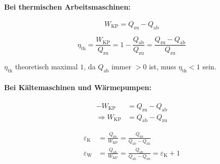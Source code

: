 			\paragraph{Bei thermischen Arbeitsmaschinen:} %
				\[
					W_{\text{KP}} = Q_{\text{zu}} - Q_{\text{ab}}
				\]
				
				\[
					\eta_{\text{th}} = \frac{W_{\text{KP}}}{Q_{\text{zu}}} = 1 - \frac{Q_{\text{ab}}}{Q_{\text{zu}}}
					= \frac{Q_{\text{zu}} - Q_{\text{ab}}}{Q_{\text{zu}}}
				\]
				
				$\eta_{\text{th}}$ theoretisch maximal $1$, da $Q_{\text{ab}}$ immer $> 0$ ist, muss $\eta_{\text{th}} < 1$ sein.
			
			\paragraph{Bei Kältemaschinen und Wärmepumpen:} %
				\begin{align*}
					-W_{\text{KP}} &= Q_{\text{zu}} - Q_{\text{ab}} \\
					\Rightarrow W_{\text{KP}} &= Q_{\text{ab}} - Q_{\text{zu}}
				\end{align*}
				
				\begin{align*}
					\varepsilon_{\text{K}} &= \frac{Q_{\text{zu}}}{W_{\text{KP}}} = \frac{Q_{\text{zu}}}{Q_{\text{ab}} - Q_{\text{zu}}} \\
					\varepsilon_{\text{W}} &= \frac{Q_{\text{ab}}}{W_{\text{KP}}} = \frac{Q_{\text{ab}}}{Q_{\text{ab}} - Q_{\text{zu}}} = \varepsilon_{\text{K}}+1
				\end{align*}
			
